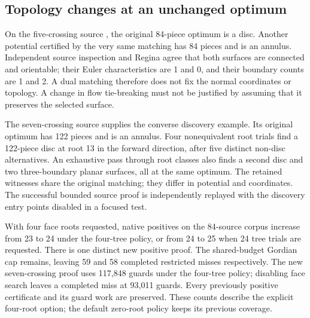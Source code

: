 \subsection{Topology changes at an unchanged optimum}

On the five-crossing source , the original
84-piece optimum is a disc. Another potential certified by the very same
matching has 84 pieces and is an annulus. Independent source inspection
and Regina agree that both surfaces are connected and orientable; their
Euler characteristics are 1 and 0, and their boundary counts are 1 and 2.
A dual matching therefore does not fix the normal coordinates or topology.
A change in flow tie-breaking must not be justified by assuming that it
preserves the selected surface.

The seven-crossing source  supplies the converse discovery
example. Its original optimum has 122 pieces and is an annulus. Four
nonequivalent root trials find a 122-piece disc at root 13 in the forward
direction, after five distinct non-disc alternatives. An exhaustive pass
through root classes also finds a second disc and two three-boundary planar
surfaces, all at the same optimum. The retained witnesses share the original
matching; they differ in potential and coordinates. The successful bounded
source proof is independently replayed with the discovery entry points
disabled in a focused test.

With four face roots requested, native positives on the 84-source corpus
increase from 23 to 24 under the four-tree policy, or from 24 to 25 when
24 tree trials are requested. There is one distinct new positive proof.
The shared-budget Gordian cap remains, leaving 59 and 58 completed restricted
misses respectively. The new seven-crossing proof uses 117,848 guards under
the four-tree policy; disabling face search leaves a completed miss at
93,011 guards. Every previously positive certificate and its guard work are
preserved. These counts describe the explicit four-root option; the default
zero-root policy keeps its previous coverage.


